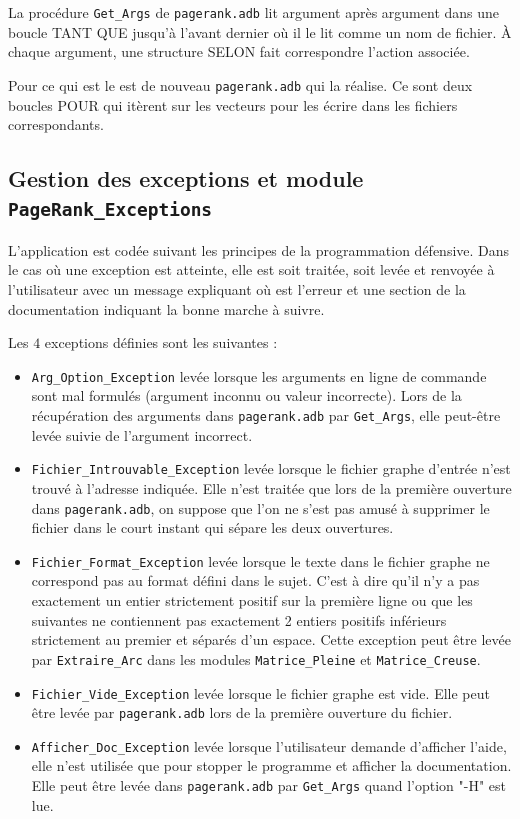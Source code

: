 \documentclass{article}
\begin{document}
La procédure \texttt{Get\_Args} de \texttt{pagerank.adb} lit argument après argument dans une boucle TANT QUE jusqu'à l'avant dernier où il le lit comme un nom de fichier. À chaque argument, une structure SELON fait correspondre l'action associée.

Pour ce qui est le est de nouveau \texttt{pagerank.adb} qui la réalise. Ce sont deux boucles POUR qui itèrent sur les vecteurs pour les écrire dans les fichiers correspondants.

\subsection{Gestion des exceptions et module \texttt{PageRank\_Exceptions}}

L'application est codée suivant les principes de la programmation défensive. Dans le cas où une exception est atteinte, elle est soit traitée, soit levée et renvoyée à l'utilisateur avec un message expliquant où est l'erreur et une section de la documentation indiquant la bonne marche à suivre.

Les $4$ exceptions définies sont les suivantes :
\begin{itemize}
    \item \texttt{Arg\_Option\_Exception} levée lorsque les arguments en ligne de commande sont mal formulés (argument inconnu ou valeur incorrecte). Lors de la récupération des arguments dans \texttt{pagerank.adb} par \texttt{Get\_Args}, elle peut-être levée suivie de l'argument incorrect.

    \item \texttt{Fichier\_Introuvable\_Exception} levée lorsque le fichier graphe d'entrée n'est trouvé à l'adresse indiquée. Elle n'est traitée que lors de la première ouverture dans \texttt{pagerank.adb}, on suppose que l'on ne s'est pas amusé à supprimer le fichier dans le court instant qui sépare les deux ouvertures.

    \item \texttt{Fichier\_Format\_Exception} levée lorsque le texte dans le fichier graphe ne correspond pas au format défini dans le sujet. C'est à dire qu'il n'y a pas exactement un entier strictement positif sur la première ligne ou que les suivantes ne contiennent pas exactement 2 entiers positifs inférieurs strictement au premier et séparés d'un espace. Cette exception peut être levée par \texttt{Extraire\_Arc} dans les modules \texttt{Matrice\_Pleine} et \texttt{Matrice\_Creuse}.

    \item \texttt{Fichier\_Vide\_Exception} levée lorsque le fichier graphe est vide. Elle peut être levée par \texttt{pagerank.adb} lors de la première ouverture du fichier.

    \item \texttt{Afficher\_Doc\_Exception} levée lorsque l'utilisateur demande d'afficher l'aide, elle n'est utilisée que pour stopper le programme et afficher la documentation. Elle peut être levée dans \texttt{pagerank.adb} par \texttt{Get\_Args} quand l'option "-H" est lue.
\end{itemize}
\end{document}
